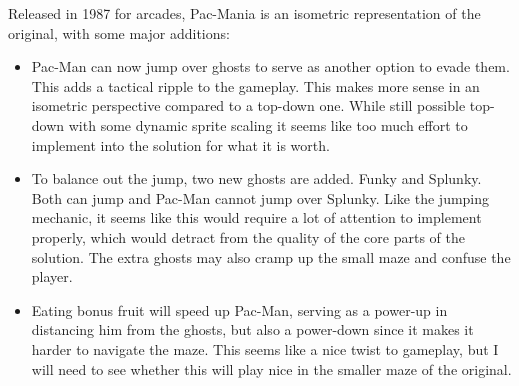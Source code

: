 \documentclass[letterpaper, 11pt]{article}
\begin{document}
Released in 1987 for arcades, Pac-Mania is an isometric representation of the original, with some major additions:

\begin{itemize}
\item Pac-Man can now jump over ghosts to serve as another option to evade them.
This adds a tactical ripple to the gameplay.
This makes more sense in an isometric perspective compared to a top-down one.
While still possible top-down with some dynamic sprite scaling it seems like too much effort to implement into the solution for what it is worth.

\item To balance out the jump, two new ghosts are added.
Funky and Splunky.
Both can jump and Pac-Man cannot jump over Splunky.
Like the jumping mechanic, it seems like this would require a lot of attention to implement properly, which would detract from the quality of the core parts of the solution.
The extra ghosts may also cramp up the small maze and confuse the player.

\item Eating bonus fruit will speed up Pac-Man, serving as a power-up in distancing him from the ghosts, but also a power-down since it makes it harder to navigate the maze.
This seems like a nice twist to gameplay, but I will need to see whether this will play nice in the smaller maze of the original.
\end{itemize}

\printbibliography
\end{document}
